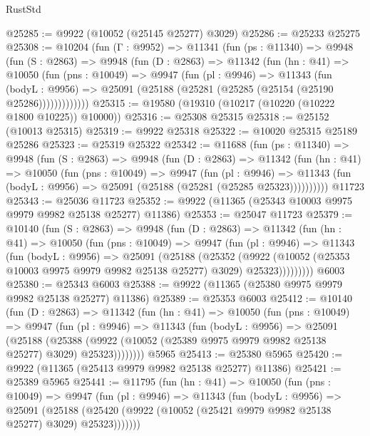 \begin{lexlean}{RustStd}
\begin{coremodule}
@25285 := @9922 (@10052 (@25145 @25277) @3029)
@25286 := @25233 @25275
@25308 := @10204
    (fun (Γ : @9952) =>
    @11341
      (fun (ps : @11340) =>
      @9948
        (fun (S : @2863) =>
        @9948
          (fun (D : @2863) =>
          @11342
            (fun (hn : @41) =>
            @10050
              (fun (pns : @10049) =>
              @9947
                (fun (pl : @9946) =>
                @11343
                  (fun (bodyL : @9956) =>
                  @25091 (@25188 (@25281 (@25285 (@25154 (@25190 @25286)))))))))))))
@25315 := @19580 (@19310 (@10217 (@10220 (@10222 @1800 @10225)) @10000))
@25316 := @25308 @25315
@25318 := @25152 (@10013 @25315)
@25319 := @9922 @25318
@25322 := @10020 @25315 @25189 @25286
@25323 := @25319 @25322
@25342 := @11688
    (fun (ps : @11340) =>
    @9948
      (fun (S : @2863) =>
      @9948
        (fun (D : @2863) =>
        @11342
          (fun (hn : @41) =>
          @10050
            (fun (pns : @10049) =>
            @9947
              (fun (pl : @9946) =>
              @11343 (fun (bodyL : @9956) => @25091 (@25188 (@25281 (@25285 @25323))))))))))
    @11723
@25343 := @25036 @11723
@25352 := @9922 (@11365 (@25343 @10003 @9975 @9979 @9982 @25138 @25277) @11386)
@25353 := @25047 @11723
@25379 := @10140
    (fun (S : @2863) =>
    @9948
      (fun (D : @2863) =>
      @11342
        (fun (hn : @41) =>
        @10050
          (fun (pns : @10049) =>
          @9947
            (fun (pl : @9946) =>
            @11343
              (fun (bodyL : @9956) =>
              @25091
                (@25188
                  (@25352
                    (@9922
                      (@10052 (@25353 @10003 @9975 @9979 @9982 @25138 @25277) @3029)
                      @25323)))))))))
    @6003
@25380 := @25343 @6003
@25388 := @9922 (@11365 (@25380 @9975 @9979 @9982 @25138 @25277) @11386)
@25389 := @25353 @6003
@25412 := @10140
    (fun (D : @2863) =>
    @11342
      (fun (hn : @41) =>
      @10050
        (fun (pns : @10049) =>
        @9947
          (fun (pl : @9946) =>
          @11343
            (fun (bodyL : @9956) =>
            @25091
              (@25188
                (@25388
                  (@9922 (@10052 (@25389 @9975 @9979 @9982 @25138 @25277) @3029) @25323))))))))
    @5965
@25413 := @25380 @5965
@25420 := @9922 (@11365 (@25413 @9979 @9982 @25138 @25277) @11386)
@25421 := @25389 @5965
@25441 := @11795
    (fun (hn : @41) =>
    @10050
      (fun (pns : @10049) =>
      @9947
        (fun (pl : @9946) =>
        @11343
          (fun (bodyL : @9956) =>
          @25091
            (@25188 (@25420 (@9922 (@10052 (@25421 @9979 @9982 @25138 @25277) @3029) @25323)))))))

\end{coremodule}
\end{lexlean}
